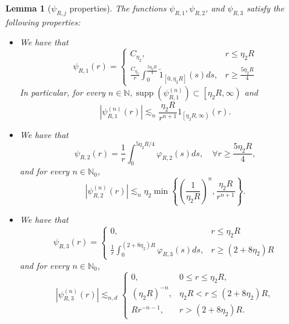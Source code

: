 \documentclass[reqno,11pt]{amsart}
\theoremstyle{plain}
\newtheorem{lemma}[theorem]{Lemma}
\theoremstyle{definition}
\numberwithin{equation}{section}
\numberwithin{theorem}{section}
\def\geq{\geqslant}
\def\leq{\leqslant}
\begin{document}
\begin{lemma}[$\psi_{R,  j}$ properties]\label{lemmapsi}
The functions $\psi_{R, 1}, \psi_{R, 2}$, and $\psi_{R, 3}$ satisfy the following properties:
   \begin{itemize}
    \item[$(i)$] We have that
    \begin{equation}\label{psi12}
        \psi_{R,  1}(r)= \begin{cases}C_{\eta_{2}}, & r \leq \eta_{2}R\\ \frac{C_{\eta_{2}} }{r } \int_{0}^{\frac{5 \eta_{2} R}{4}} \tilde{1}_{[0,\eta_2R]}(s) d s, & r \geq \frac{5 \eta_{2} R}{4}\end{cases}
    \end{equation}
In particular, for every $n \in \mathbb{N}, \operatorname{supp}\left(\psi_{R,  1}^{(n)}\right) \subset\left[\eta_{2} R, \infty\right)$ and
    \begin{equation}\label{psi1est}
        \left|\psi_{R,1}^{(n)}(r)\right| \lesssim_{n} \frac{\eta_{2} R}{r^{n+1}} 1_{\left[\eta_{2} R, \infty\right)}(r).
    \end{equation}
 \item[$(ii)$] We have that
 \begin{equation}\label{psi22}
    \psi_{R, 2}(r)=\frac{1}{r} \int_{0}^{5 \eta_{2} R / 4} \varphi_{R, 2}(s) d s, \quad \forall r \geq \frac{5 \eta_{2} R}{4 }, 
 \end{equation}
and for every $n \in \mathbb{N}_{0}$,
\begin{equation}\label{psi2est}
\left|\psi_{R,2}^{(n)}(r)\right| \lesssim_{n} \eta_{2} \min \left\{\left(\frac{1}{\eta_{2} R}\right)^{n}, \frac{\eta_{2} R}{ r^{n+1}}\right\}. 
\end{equation}
\item[$(iii)$] We have that
\begin{equation}\label{psi32}
    \psi_{R, 3}(r)= \begin{cases}0, & r \leq \eta_{2} R \\ \frac{1}{r} \int_{0}^{\left(2+8 \eta_{2}\right) R} \varphi_{R, 3}(s) d s, & r \geq \left(2+8 \eta_{2}\right) R\end{cases}
\end{equation}
and for every $n \in \mathbb{N}_{0}$,
\begin{equation}\label{psi3est}
\left|\psi_{R,3}^{(n)}(r)\right| \lesssim_{n,d}
\begin{cases}
0, & 0\leq r\leq\eta_2R,\\
(\eta_2R)^{-n}, & \eta_2R<r\leq(2+8\eta_2)R,\\
Rr^{-n-1}, & r>(2+8\eta_2)R.
\end{cases}
\end{equation}
   \end{itemize} 
\end{lemma}
\end{document}
